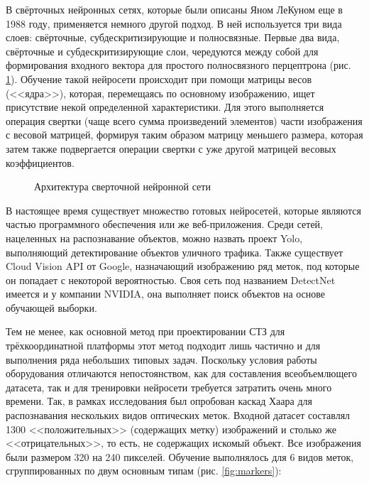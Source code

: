В свёрточных нейронных сетях, которые были описаны Яном ЛеКуном еще в 1988 году, применяется немного другой подход. В ней используется три вида слоев: свёрточные, субдескритизирующие и полносвязные. Первые два вида, свёрточные и субдескритизирующие слои, чередуются между собой для формирования входного вектора для простого полносвязного перцептрона (рис. \cref{fig:cnc-arch}). Обучение такой нейросети происходит при помощи матрицы весов (<<ядра>>), которая, перемещаясь по основному изображению, ищет присутствие некой определенной характеристики. Для этого выполняется операция свертки (чаще всего сумма произведений элементов) части изображения с весовой матрицей, формируя таким образом матрицу меньшего размера, которая затем также подвергается операции свертки с уже другой матрицей весовых коэффициентов.

\begin{figure}[ht]
	\caption{Архитектура сверточной нейронной сети}\label{fig:cnc-arch}
\end{figure}

В настоящее время существует множество готовых нейросетей, которые являются частью программного обеспечения или же веб-приложения. Среди сетей, нацеленных на распознавание объектов, можно назвать проект Yolo, выполняющий детектирование объектов уличного трафика. Также существует Cloud Vision API от Google, назначающий изображению ряд меток, под которые он попадает с некоторой вероятностью. Своя сеть под названием DetectNet имеется и у компании NVIDIA, она выполняет поиск объектов на основе обучающей выборки.

Тем не менее, как основной метод при проектировании СТЗ для трёхкоординатной платформы этот метод подходит лишь частично и для выполнения ряда небольших типовых задач. Поскольку условия работы оборудования отличаются непостоянством, как для составления всеобъемлющего датасета, так и для тренировки нейросети требуется затратить очень много времени. Так, в рамках исследования был опробован каскад Хаара для распознавания нескольких видов оптических меток. Входной датасет составлял 1300 <<положительных>> (содержащих метку) изображений и столько же <<отрицательных>>, то есть, не содержащих искомый объект. Все изображения были размером 320 на 240 пикселей. Обучение выполнялось для 6 видов меток, сгруппированных по двум основным типам (рис. \cref{fig:markers}):


